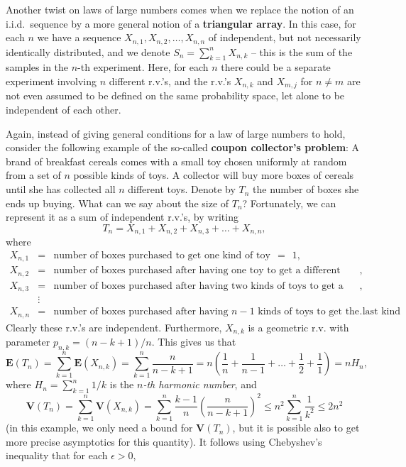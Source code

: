 \documentclass[12pt]{article}
\newcommand{\expec}{\mathbf{E}}
\newcommand{\var}{\mathbf{V}}
\theoremstyle{example}
\begin{document}
Another twist on laws of large numbers comes when we replace the notion of an i.i.d.\ sequence by a more general notion of a \textbf{triangular array}. In this case, for each $n$ we have a sequence $X_{n,1},X_{n,2},\ldots,X_{n,n}$ of independent, but not necessarily identically distributed, and we denote $S_n=\sum_{k=1}^n X_{n,k}$ -- this is the sum of the samples in the $n$-th experiment. Here, for each $n$ there could be a separate experiment involving $n$ different r.v.'s, and the r.v.'s $X_{n,k}$ and $X_{m,j}$ for $n\neq m$ are not even assumed to be defined on the same probability space, let alone to be independent of each other.

Again, instead of giving general conditions for a law of large numbers to hold, consider the following example of the so-called \textbf{coupon collector's problem}: A brand of breakfast cereals comes with a small toy chosen uniformly at random from a set of $n$ possible kinds of toys. A collector will buy more boxes of cereals until she has collected all $n$ different toys. Denote by $T_n$ the number of boxes she ends up buying. What can we say about the size of $T_n$? Fortunately, we can represent it as a sum of independent r.v.'s, by writing
$$ T_n = X_{n,1} + X_{n,2} + X_{n,3} + \ldots + X_{n,n}, $$
where
\begin{eqnarray*}
X_{n,1} &=& \textrm{number of boxes purchased to get one kind of toy} \ \ =\ \ 1, \\
X_{n,2} &=& \textrm{number of boxes purchased after having one toy to get a different kind}, \\
X_{n,3} &=& \textrm{number of boxes purchased after having two kinds of toys to get a third kind}, \\
& \vdots&  \\
X_{n,n} &=& \textrm{number of boxes purchased after having $n-1$ kinds of toys to get the last kind}.
\end{eqnarray*}
Clearly these r.v.'s are independent. Furthermore, $X_{n,k}$ is a geometric r.v. with parameter $p_{n,k} = (n-k+1)/n$. This gives us that
$$ \expec(T_n) = \sum_{k=1}^n \expec(X_{n,k}) = \sum_{k=1}^n \frac{n}{n-k+1} = n\left(\frac{1}{n}+\frac{1}{n-1}+\ldots+\frac{1}{2}+\frac{1}{1}\right) = n H_n, $$
where $ H_n = \sum_{k=1}^n 1/k$ is the \emph{$n$-th harmonic number}, and
$$ \var(T_n) = \sum_{k=1}^n \var(X_{n,k}) = 
\sum_{k=1}^n \frac{k-1}{n}\left(\frac{n}{n-k+1}\right)^2 \le n^2 \sum_{k=1}^n \frac{1}{k^2} \le 2 n^2
$$
(in this example, we only need a bound for $\var(T_n)$, but it is possible also to get more precise asymptotics for this quantity). It follows using Chebyshev's inequality that for each $\epsilon>0$,
\end{document}
